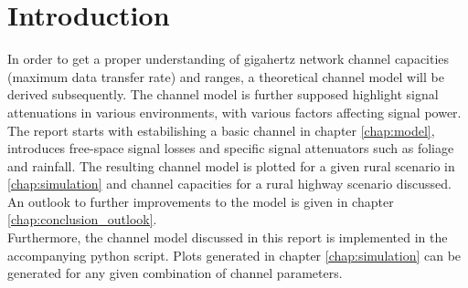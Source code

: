 \graphicspath{{figures/}}


                       
\chapter{Introduction}

In order to get a proper understanding of gigahertz network channel capacities 
(maximum data transfer rate) and ranges, a theoretical channel model will be 
derived subsequently. The channel model is further supposed highlight signal attenuations 
in various environments, with various factors affecting signal power. \\
The report starts with estabilishing a basic channel in chapter \ref{chap:model}, 
introduces free-space signal losses and specific signal attenuators such as foliage and rainfall.
The resulting channel model is plotted for a given rural scenario in \ref{chap:simulation} 
and channel capacities for a rural highway scenario discussed.\\
An outlook to further improvements to the model is given in chapter \ref{chap:conclusion_outlook}.\\
Furthermore, the channel model discussed in this report is implemented in the accompanying 
python script. Plots generated in chapter \ref{chap:simulation} can be generated for any 
given combination of channel parameters. 




